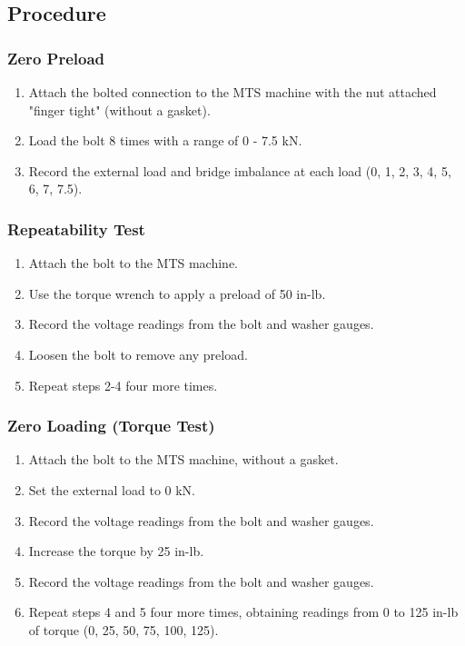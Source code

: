 \subsection{Procedure}
\subsubsection{Zero Preload}
\begin{enumerate}
    \item Attach the bolted connection to the MTS machine with the nut attached "finger tight" (without a gasket).
    \item Load the bolt 8 times with a range of 0 - 7.5 kN.
    \item Record the external load and bridge imbalance at each load (0, 1, 2, 3, 4, 5, 6, 7, 7.5).
\end{enumerate}
\subsubsection{Repeatability Test}
\begin{enumerate}
    \item Attach the bolt to the MTS machine.
    \item Use the torque wrench to apply a preload of 50 in-lb.
    \item Record the voltage readings from the bolt and washer gauges.
    \item Loosen the bolt to remove any preload.
    \item Repeat steps 2-4 four more times.
\end{enumerate}
\subsubsection{Zero Loading (Torque Test)}
\begin{enumerate}
    \item Attach the bolt to the MTS machine, without a gasket.
    \item Set the external load to 0 kN.
    \item Record the voltage readings from the bolt and washer gauges.
    \item Increase the torque by 25 in-lb.
    \item Record the voltage readings from the bolt and washer gauges.
    \item Repeat steps 4 and 5 four more times, obtaining readings from 0 to 125 in-lb of torque (0, 25, 50, 75, 100, 125).
\end{enumerate}
